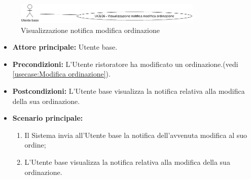 \label{usecase:Visualizzazione notifica modifica ordinazione}

\begin{figure}[h]
	\centering
	\includegraphics[width=0.8\textwidth]{./uml/UCB16.png} 
	\caption{Visualizzazione notifica modifica ordinazione}
	\label{fig:UCB18}
  \end{figure}

\begin{itemize}
	\item \textbf{Attore principale:} Utente base.

	\item \textbf{Precondizioni:} L'Utente ristoratore ha modificato un ordinazione.(vedi \autoref{usecase:Modifica ordinazione}).

	\item \textbf{Postcondizioni:} L'Utente base visualizza la notifica relativa alla modifica della sua ordinazione.

	\item \textbf{Scenario principale:}
	      \begin{enumerate}
		      \item Il Sistema invia all'Utente base la notifica dell'avvenuta modifica al suo ordine;

		      \item L'Utente base visualizza la notifica relativa alla modifica della sua ordinazione.
	      \end{enumerate}
\end{itemize}
